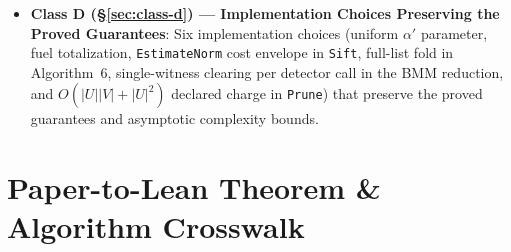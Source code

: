 \documentclass[10pt,letterpaper]{article}
\renewcommand{\_}{\origunderscore\allowbreak}
\newcommand{\code}[1]{\texttt{#1}}
\begin{document}
\begin{itemize}
  \item \textbf{Class D (\S\ref{sec:class-d}) --- Implementation Choices Preserving the Proved Guarantees}: Six implementation choices (uniform $\alpha'$ parameter, fuel totalization, \code{EstimateNorm} cost envelope in \code{Sift}, full-list fold in Algorithm~6, single-witness clearing per detector call in the BMM reduction, and $O(|U||V|+|U|^2)$ declared charge in \code{Prune}) that preserve the proved guarantees and asymptotic complexity bounds.
\end{itemize}

\section{Paper-to-Lean Theorem \& Algorithm Crosswalk}
\label{sec:crosswalk}
\end{document}
